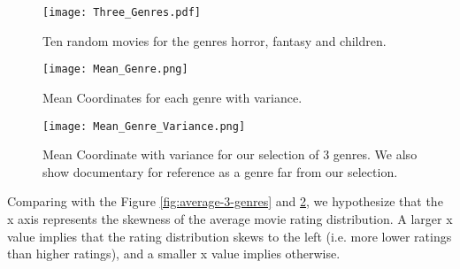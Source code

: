 \begin{figure}[hptb]
\centering
\texttt{[image: Three\_Genres.pdf]}
 \caption{Ten random movies for the genres horror, fantasy and children. }
\label{fig:tg}
\end{figure}

\begin{figure}[hptb]
\centering
\texttt{[image: Mean\_Genre.png]}
 \caption{Mean Coordinates for each genre with variance.}
\label{fig:tgMeanGenre}
\end{figure}

\begin{figure}[hptb]
\centering
\texttt{[image: Mean\_Genre\_Variance.png]}
 \caption{Mean Coordinate with variance for our selection of 3 genres. We also show documentary for reference as a genre far from our selection.}
\label{fig:tgMV}
\end{figure}

Comparing with the Figure \ref{fig:average-3-genres} and \ref{fig:tgMeanGenre}, we hypothesize that the x axis represents the skewness of the average movie rating distribution. A larger x value implies that the rating distribution skews to the left (i.e. more lower ratings than higher ratings), and a smaller x value implies otherwise.


